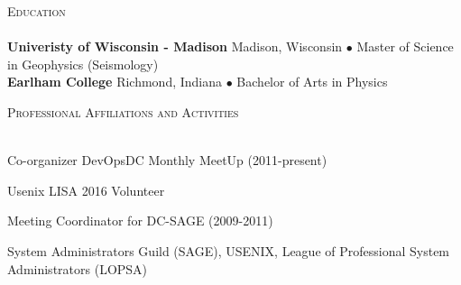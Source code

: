 \documentclass{article}
\newcommand{\lineunder}{\vspace*{-8pt} \\ \hspace*{-18pt} \hrulefill \\}
\newcommand{\header}[1]{{\hspace*{-15pt}\vspace*{6pt} \textsc{#1}} \vspace*{-6pt} \lineunder}
\newenvironment{achievements}{\begin{list}{\topsep 0pt \itemsep -2pt}} {\vspace*{4pt}\end{list}}
\newcommand{\school}[3]{
 \textbf{#1} #2 $\bullet$ #3\\
}
\begin{document}
\header{Education}

\school{Univeristy of Wisconsin - Madison}{Madison, Wisconsin} {Master of Science in Geophysics (Seismology)}
\school{Earlham College}{Richmond, Indiana}{Bachelor of Arts in Physics}
\vspace{18pt}

\header{Professional Affiliations and Activities}
\begin{achievements}
\item Co-organizer DevOpsDC Monthly MeetUp (2011-present)
\item Usenix LISA 2016 Volunteer
\item Meeting Coordinator for DC-SAGE (2009-2011)
\item System Administrators Guild (SAGE), USENIX, League of Professional System Administrators (LOPSA)
\end{achievements}


\end{document}
